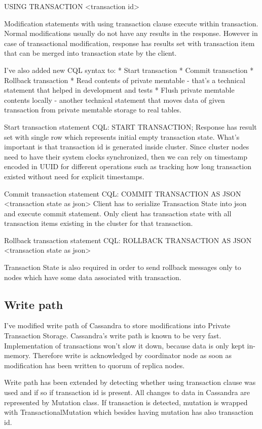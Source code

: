 USING TRANSACTION <transaction id>


Modification statements with using transaction clause execute within transaction. 
Normal modifications usually do not have any results in the response. However in case of transactional modification, response has results set with transaction item that can be merged into transaction state by the client.


I’ve also added new CQL syntax to:
* Start transaction
* Commit transaction
* Rollback transaction
* Read contents of private memtable - that’s a technical statement that helped in development and tests
* Flush private memtable contents locally - another technical statement that moves data of given transaction from private memtable storage to real tables.


Start transaction statement
CQL:        START TRANSACTION;
Response has result set with single row which represents initial empty transaction state. 
What’s important is that transaction id is generated inside cluster. Since cluster nodes need to have their system clocks synchronized, then we can rely on timestamp encoded in UUID for different operations such as tracking how long transaction existed without need for explicit timestamps.


Commit transaction statement
CQL: COMMIT TRANSACTION AS JSON <transaction state as json>
Client has to serialize Transaction State into json and execute commit statement. Only client has transaction state with all transaction items existing in the cluster for that transaction.


Rollback transaction statement
CQL: ROLLBACK TRANSACTION AS JSON <transaction state as json>


Transaction State is also required in order to send rollback messages only to nodes which have some data associated with transaction.




\subsection{Write path}
I’ve modified write path of Cassandra to store modifications into Private Transaction Storage.
Cassandra’s write path is known to be very fast. Implementation of transactions won’t slow it down, because data is only kept in-memory. Therefore write is acknowledged by coordinator node as soon as modification has been written to quorum of replica nodes.


Write path has been extended by detecting whether using transaction clause was used and if so if transaction id is present. All changes to data in Cassandra are represented by Mutation class. If transaction is detected, mutation is wrapped with TransactionalMutation which besides having mutation has also transaction id.


